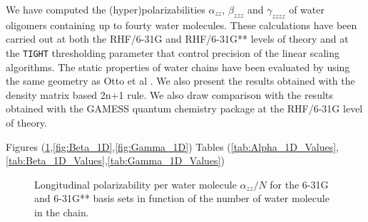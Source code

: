 \documentclass[prl,aps,twocolumn,showpacs,twocolumngrid,superbib]{revtex4}
\begin{document}
We have computed the (hyper)polarizabilities $\alpha_{zz}$, 
$\beta_{zzz}$ and $\gamma_{zzzz}$ of water oligomers containing
up to fourty water molecules. These calculations have been carried out at
both the RHF/6-31G and RHF/6-31G** levels of
theory and at the {\tt TIGHT} thresholding parameter 
that control precision of the linear scaling algorithms.
The static properties of water chains have been evaluated
by using the same geometry as Otto et al \cite{POtto00}. We also
present the results obtained with the density matrix based 2n+1 rule.
We also draw comparison with the results obtained with the GAMESS 
quantum chemistry package \cite{gamess} at the RHF/6-31G level of theory.


Figures (\ref{fig:Alpha_1D},\ref{fig:Beta_1D},\ref{fig:Gamma_1D})
Tables (\ref{tab:Alpha_1D_Values},\ref{tab:Beta_1D_Values},\ref{tab:Gamma_1D_Values})


\begin{figure}[t]
  \caption{\protect
    Longitudinal polarizability per water molecule
    $\alpha_{zz}/N$ for 
    the 6-31G and 6-31G** basis sets in function
    of the number of water molecule in the chain.
  }\label{fig:Alpha_1D}
\end{figure}
\end{document}
